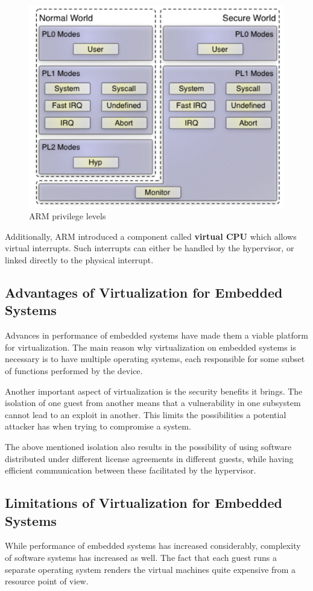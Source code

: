 \begin{figure}[h]
\centering
  \includegraphics[width=.5\linewidth]{img/arm.png}
  \caption{ARM privilege levels\cite{genode-arm}}
\end{figure}

Additionally, ARM introduced a component called \textbf{virtual CPU} which allows virtual interrupts. Such interrupts can either be handled by the hypervisor, or linked directly to the physical interrupt\cite{hw-support-arm}.

\subsection{Advantages of Virtualization for Embedded Systems}
\label{subsec:advvirt}

Advances in performance of embedded systems have made them a viable platform for virtualization. The main reason why virtualization on embedded systems is necessary is to have multiple operating systems, each responsible for some subset of functions performed by the device.

Another important aspect of virtualization is the security benefits it brings. The isolation of one guest from another means that a vulnerability in one subsystem cannot lead to an exploit in another. This limits the possibilities a potential attacker has when trying to compromise a system\cite{virt-embedded}.

The above mentioned isolation also results in the possibility of using software distributed under different license agreements in different guests, while having efficient communication between these facilitated by the hypervisor.

\subsection{Limitations of Virtualization for Embedded Systems}
\label{subsec:limitvirt}

While performance of embedded systems has increased considerably, complexity of software systems has increased as well. The fact that each guest runs a separate operating system renders the virtual machines quite expensive from a resource point of view.

